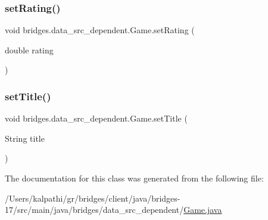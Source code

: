 \subsubsection{\texorpdfstring{set\+Rating()}{setRating()}}
{\footnotesize\ttfamily void bridges.\+data\+\_\+src\+\_\+dependent.\+Game.\+set\+Rating (\begin{DoxyParamCaption}\item[{double}]{rating }\end{DoxyParamCaption})}

\mbox{\label{classbridges_1_1data__src__dependent_1_1_game_a0c87151b75bc10357aa6829ebfc0cae3}} 
\subsubsection{\texorpdfstring{set\+Title()}{setTitle()}}
{\footnotesize\ttfamily void bridges.\+data\+\_\+src\+\_\+dependent.\+Game.\+set\+Title (\begin{DoxyParamCaption}\item[{String}]{title }\end{DoxyParamCaption})}



The documentation for this class was generated from the following file\+:\begin{DoxyCompactItemize}
\item 
/\+Users/kalpathi/gr/bridges/client/java/bridges-\/17/src/main/java/bridges/data\+\_\+src\+\_\+dependent/\mbox{\hyperlink{_game_8java}{Game.\+java}}\end{DoxyCompactItemize}
